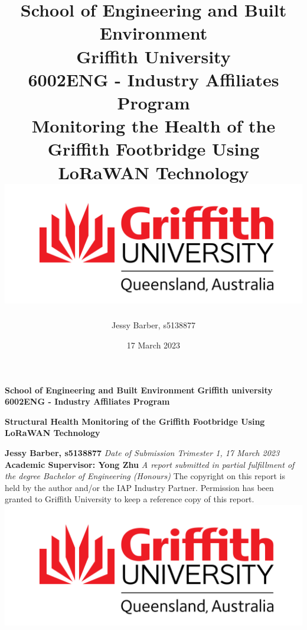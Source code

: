 \documentclass[12pt]{article}
\title{{\large School of Engineering and Built Environment}\\
{\large Griffith University}\\
{\large 6002ENG - Industry Affiliates Program}\\
{\textbf{Monitoring the Health of the Griffith Footbridge Using LoRaWAN Technology}}\\
{\includegraphics[scale=0.4]{Images/University.png}}		
}
\author{Jessy Barber, s5138877}
\date{17 March 2023}
\begin{document}
 

\begin{titlepage}
\vspace*{1cm}
\noindent\textbf{\large{School of Engineering and Built Environment}}
\newline
\textbf{\large{Griffith university}}
\vspace*{1cm}
\newline
\textbf{\large{6002ENG - Industry Affiliates Program}}\\
\vspace*{1cm}
\newline
\begin{centering}
	\textbf{\LARGE{Structural Health Monitoring of the Griffith Footbridge Using
 LoRaWAN Technology}}
\end{centering}	
\vspace*{2cm}
\newline
\textbf{\large{Jessy Barber, s5138877}}
\vspace*{1cm}
\newline
\hspace*{5cm}
\emph{Date of Submission Trimester 1, 17 March 2023}
\vspace*{2cm}
\newline
\textbf{\large{Academic Supervisor: Yong Zhu}}
\vspace*{1cm}
\newline
\emph{A report submitted in partial fulfillment of the degree Bachelor of Engineering (Honours)}
\vspace*{1cm}
\newline
\footnotesize{The copyright on this report is held by the author and/or the IAP Industry Partner. Permission has been granted to Griffith University to keep a reference copy of this report.}
\newline
\includegraphics[scale=0.4, right]{Images/University.png}
\end{titlepage}

\newpage
{}
\pagestyle{fancy}
\fancyhead{}
\fancyfoot{}
\fancyfoot[RE,RO]{\thepage}
\end{document}
